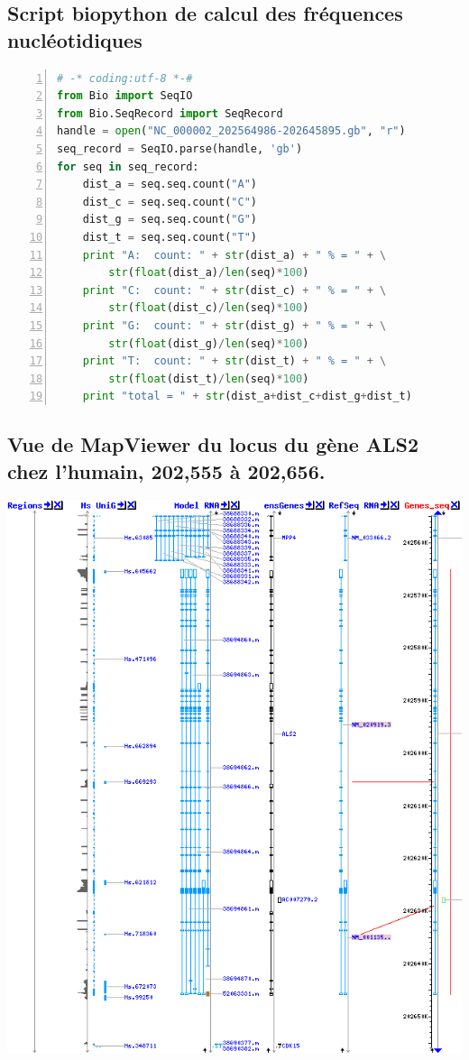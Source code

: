 \documentclass[11pt]{article} %
\begin{document}
\subsection{Script biopython de calcul des fréquences nucléotidiques}\label{3}
\begin{lstlisting}[frame=single,numbers=left,language=Python]
# -* coding:utf-8 *-#
from Bio import SeqIO
from Bio.SeqRecord import SeqRecord
handle = open("NC_000002_202564986-202645895.gb", "r")
seq_record = SeqIO.parse(handle, 'gb')
for seq in seq_record:
    dist_a = seq.seq.count("A")
    dist_c = seq.seq.count("C")
    dist_g = seq.seq.count("G")
    dist_t = seq.seq.count("T")
    print "A:  count: " + str(dist_a) + " % = " + \
        str(float(dist_a)/len(seq)*100)
    print "C:  count: " + str(dist_c) + " % = " + \
        str(float(dist_c)/len(seq)*100)
    print "G:  count: " + str(dist_g) + " % = " + \
        str(float(dist_g)/len(seq)*100)
    print "T:  count: " + str(dist_t) + " % = " + \
        str(float(dist_t)/len(seq)*100)
    print "total = " + str(dist_a+dist_c+dist_g+dist_t)
\end{lstlisting}

\subsection{Vue de MapViewer du locus du gène ALS2 chez l'humain, 202,555 à 202,656.}\label{4}
\includegraphics[width=\linewidth]{annexes/annexe1b_mapviewer_202555-202656.png}
\end{document}

